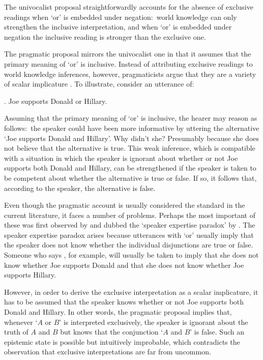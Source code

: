 \documentclass[12pt]{article}
\begin{document}
The univocalist proposal straightforwardly accounts for the absence of exclusive readings when `or' is embedded under negation:\ world knowledge can only strengthen the inclusive interpretation, and when `or' is embedded under negation the inclusive reading is stronger than the exclusive one.

The pragmatic proposal mirrors the univocalist one in that it assumes that the primary meaning of `or' is inclusive. Instead of attributing exclusive readings to world knowledge inferences, however, pragmaticists argue that they are a variety of scalar implicature \citep[e.g.,][]{horn1972, gazdar1979, sauerland2004, geurts2010}. To illustrate, consider an utterance of:

\ex.	Joe supports Donald or Hillary.

Assuming that the primary meaning of `or' is inclusive, the hearer may reason as follows:\ the speaker could have been more informative by uttering the alternative `Joe supports Donald and Hillary'. Why didn't she? Presumably because she does not believe that the alternative is true. This weak inference, which is compatible with a situation in which the speaker is ignorant about whether or not Joe supports both Donald and Hillary, can be strengthened if the speaker is taken to be competent about whether the alternative is true or false. If so, it follows that, according to the speaker, the alternative is false.

Even though the pragmatic account is usually considered the standard in the current literature, it faces a number of problems. Perhaps the most important of these was first observed by \citet{geurts2006} and dubbed the `speaker expertise paradox' by \citet{zondervan2010}. The speaker expertise paradox arises because utterances with `or' usually imply that the speaker does not know whether the individual disjunctions are true or false. Someone who says \Last, for example, will usually be taken to imply that she does not know whether Joe supports Donald and that she does not know whether Joe supports Hillary.

However, in order to derive the exclusive interpretation as a scalar implicature, it has to be assumed that the speaker knows whether or not Joe supports both Donald and Hillary. In other words, the pragmatic proposal implies that, whenever `$A$ or $B$' is interpreted exclusively, the speaker is ignorant about the truth of $A$ and $B$ but knows that the conjunction `$A$ and $B$' is false. Such an epistemic state is possible but intuitively improbable, which contradicts the observation that exclusive interpretations are far from uncommon.
\end{document}
